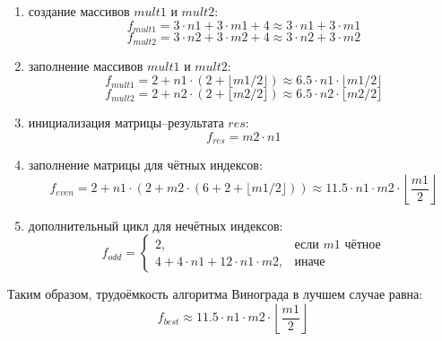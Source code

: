 \documentclass[a4paper, 12pt]{extreport}
\begin{document}
\begin{enumerate}
    \item[--] создание массивов $mult1$ и $mult2$:
    \begin{equation}
    f_{mult1} = 3 \cdot n1 + 3 \cdot m1 + 4 \approx 3 \cdot n1 + 3 \cdot m1
    \end{equation}
    \begin{equation}
    f_{mult2} = 3 \cdot n2 + 3 \cdot m2 + 4 \approx 3 \cdot n2 + 3 \cdot m2
    \end{equation}

    \item[--] заполнение массивов $mult1$ и $mult2$:
    \begin{equation}
    f_{mult1} = 2 + n1 \cdot (2 + \lfloor m1 / 2 \rfloor) \approx 6.5 \cdot n1 \cdot \lfloor m1 / 2 \rfloor
    \end{equation}
    \begin{equation}
    f_{mult2} = 2 + n2 \cdot (2 + \lfloor m2 / 2 \rfloor) \approx 6.5 \cdot n2 \cdot \lfloor m2 / 2 \rfloor
    \end{equation}

    \item[--] инициализация матрицы--результата $res$:
    \begin{equation}
    f_{res} = m2 \cdot n1
    \end{equation}

    \item[--] заполнение матрицы для чётных индексов:
    \begin{equation}
    f_{even} = 2 + n1 \cdot \left(2 + m2 \cdot \left(6 + 2 + \lfloor m1 / 2 \rfloor\right)\right) \approx 11.5 \cdot n1 \cdot m2 \cdot \left\lfloor \frac{m1}{2} \right\rfloor
    \end{equation}

    \item[--] дополнительный цикл для нечётных индексов:
    \begin{equation}
    f_{odd} = 
    \begin{cases}
    2, & \text{если } m1 \text{ чётное} \\
    4 + 4 \cdot n1 + 12 \cdot n1 \cdot m2, & \text{иначе}
    \end{cases}
    \end{equation}
\end{enumerate}

Таким образом, трудоёмкость алгоритма Винограда в лучшем случае равна:
\begin{equation}
f_{best} \approx 11.5 \cdot n1 \cdot m2 \cdot \left\lfloor \frac{m1}{2} \right\rfloor
\end{equation}
\end{document}
